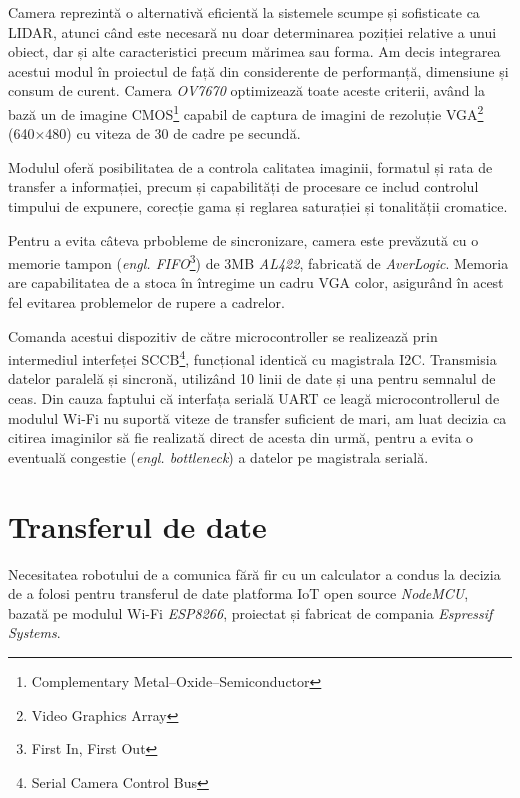 Camera reprezintă o alternativă eficientă la sistemele scumpe și sofisticate ca LIDAR, atunci când este necesară nu doar determinarea poziției relative a unui obiect, dar și alte caracteristici precum mărimea sau forma. Am decis integrarea acestui modul în proiectul de față din considerente de performanță, dimensiune și consum de curent. Camera \textit{OV7670} optimizează toate aceste criterii, având la bază un de imagine CMOS\footnote{Complementary Metal–Oxide–Semiconductor} capabil de captura de imagini de rezoluție VGA\footnote{Video Graphics Array} (640×480) cu viteza de 30 de cadre pe secundă.


Modulul oferă posibilitatea de a controla calitatea imaginii, formatul și rata de transfer a informației, precum și capabilități de procesare ce includ controlul timpului de expunere, corecție gama și reglarea saturației și tonalității cromatice.

Pentru a evita câteva prbobleme de sincronizare, camera este prevăzută cu o memorie tampon (\textit{engl. FIFO}\footnote{First In, First Out}) de 3MB \textit{AL422}, fabricată de \textit{AverLogic}. Memoria are capabilitatea de a stoca în întregime un cadru VGA color, asigurând în acest fel evitarea problemelor de rupere a cadrelor.

Comanda acestui dispozitiv de către microcontroller se realizează prin intermediul interfeței SCCB\footnote{Serial Camera Control Bus}, funcțional identică cu magistrala I2C. Transmisia datelor paralelă și sincronă, utilizând 10 linii de date și una pentru semnalul de ceas. Din cauza faptului că interfața serială UART ce leagă microcontrollerul de modulul Wi-Fi nu suportă viteze de transfer suficient de mari, am luat decizia ca citirea imaginilor să fie realizată direct de acesta din urmă, pentru a evita o eventuală congestie (\textit{engl. bottleneck}) a datelor pe magistrala serială.


\section{Transferul de date}

Necesitatea robotului de a comunica fără fir cu un calculator a condus la decizia de a folosi pentru transferul de date platforma IoT open source \textit{NodeMCU}, bazată pe modulul Wi-Fi \textit{ESP8266}, proiectat și fabricat de compania \textit{Espressif Systems}.


